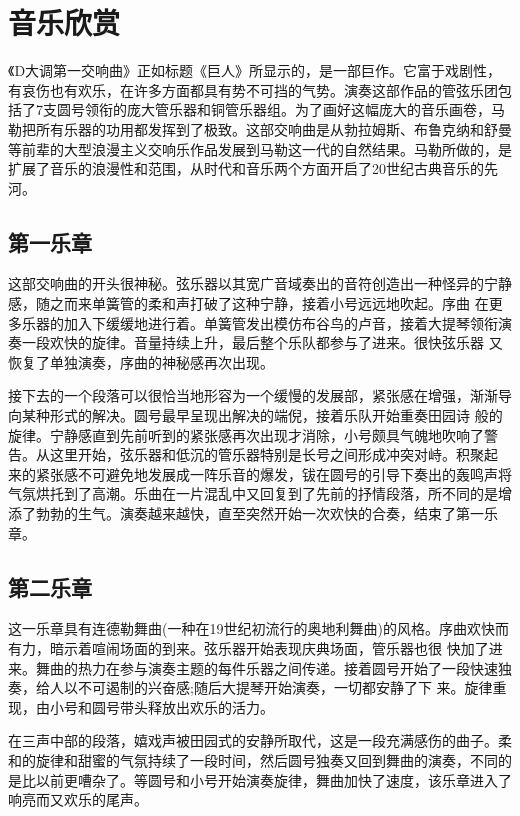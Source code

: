 \documentclass[a4paper,left=2.5cm,right=2.5cm,11pt]{article}
\begin{document}
\section{音乐欣赏}
	《D大调第一交响曲》正如标题《巨人》所显示的，是一部巨作。它富于戏剧性，有哀伤也有欢乐，在许多方面都具有势不可挡的气势。演奏这部作品的管弦乐团包括了7支圆号领衔的庞大管乐器和铜管乐器组。为了画好这幅庞大的音乐画卷，马勒把所有乐器的功用都发挥到了极致。这部交响曲是从勃拉姆斯、布鲁克纳和舒曼等前辈的大型浪漫主义交响乐作品发展到马勒这一代的自然结果。马勒所做的，是扩展了音乐的浪漫性和范围，从时代和音乐两个方面开启了20世纪古典音乐的先河。

\subsection{第一乐章}
	这部交响曲的开头很神秘。弦乐器以其宽广音域奏出的音符创造出一种怪异的宁静感，随之而来单簧管的柔和声打破了这种宁静，接着小号远远地吹起。序曲 在更多乐器的加入下缓缓地进行着。单簧管发出模仿布谷鸟的卢音，接着大提琴领衔演奏一段欢快的旋律。音量持续上升，最后整个乐队都参与了进来。很快弦乐器 又恢复了单独演奏，序曲的神秘感再次出现。\par
	接下去的一个段落可以很恰当地形容为一个缓慢的发展部，紧张感在增强，渐渐导向某种形式的解决。圆号最早呈现出解决的端倪，接着乐队开始重奏田园诗 般的旋律。宁静感直到先前听到的紧张感再次出现才消除，小号颇具气魄地吹响了警告。从这里开始，弦乐器和低沉的管乐器特别是长号之间形成冲突对峙。积聚起 来的紧张感不可避免地发展成一阵乐音的爆发，钹在圆号的引导下奏出的轰鸣声将
	气氛烘托到了高潮。乐曲在一片混乱中又回复到了先前的抒情段落，所不同的是增 添了勃勃的生气。演奏越来越快，直至突然开始一次欢快的合奏，结束了第一乐章。

\subsection{第二乐章}
	这一乐章具有连德勒舞曲(一种在19世纪初流行的奥地利舞曲)的风格。序曲欢快而有力，暗示着喧闹场面的到来。弦乐器开始表现庆典场面，管乐器也很 快加了进来。舞曲的热力在参与演奏主题的每件乐器之间传递。接着圆号开始了一段快速独奏，给人以不可遏制的兴奋感;随后大提琴开始演奏，一切都安静了下 来。旋律重现，由小号和圆号带头释放出欢乐的活力。\par
	在三声中部的段落，嬉戏声被田园式的安静所取代，这是一段充满感伤的曲子。柔和的旋律和甜蜜的气氛持续了一段时间，然后圆号独奏又回到舞曲的演奏，不同的是比以前更嘈杂了。等圆号和小号开始演奏旋律，舞曲加快了速度，该乐章进入了响亮而又欢乐的尾声。
\end{document}

